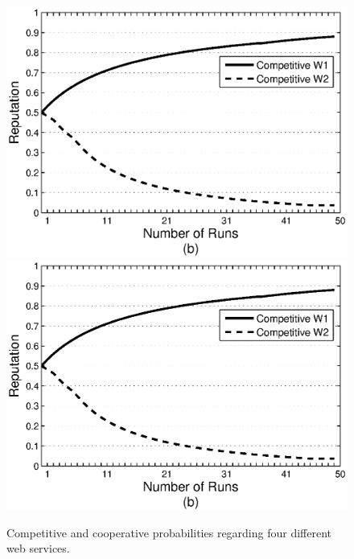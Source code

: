 \documentclass[fleqn]{singlecol-new}
\begin{document}
\begin{figure}%
\centering
\includegraphics[scale=0.4]{graphcomp.eps}
\includegraphics[scale=0.4]{graphcomp.eps}
\caption{Competitive and cooperative probabilities regarding four
different web services.} \label{Graph2}
\end{figure}
\end{document}
